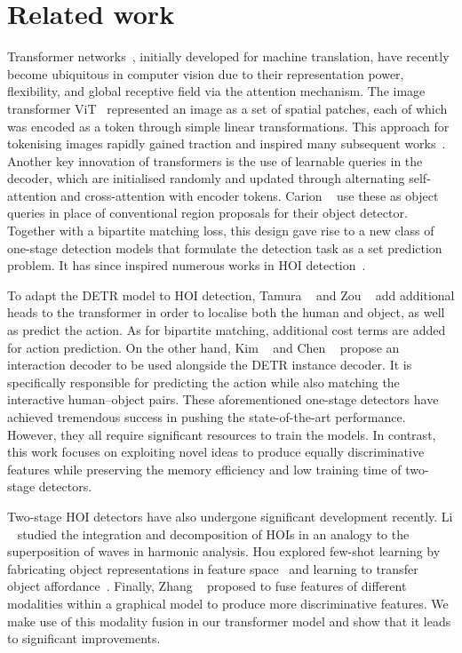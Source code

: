 \documentclass[10pt,twocolumn,letterpaper]{article}
\begin{document}
\section{Related work}

Transformer networks~\cite{xfmer}, initially developed for machine translation, have recently become ubiquitous in computer vision due to their representation power, flexibility, and global receptive field via the attention mechanism. The image transformer ViT~\cite{vit} represented an image as a set of spatial patches, each of which was encoded as a token through simple linear transformations. This approach for tokenising images rapidly gained traction and inspired many subsequent works~\cite{swint}. Another key innovation of transformers is the use of learnable queries in the decoder, which are initialised randomly and updated through alternating self-attention and cross-attention with encoder tokens. Carion \etal~\cite{detr} use these as object queries in place of conventional region proposals for their object detector. Together with a bipartite matching loss, this design gave rise to a new class of one-stage detection models that formulate the detection task as a set prediction problem. It has since inspired numerous works in HOI detection~\cite{qpic, hoitrans, hotr, asnet}.

To adapt the DETR model to HOI detection, Tamura \etal~\cite{qpic} and Zou \etal~\cite{hoitrans} add additional heads to the transformer in order to localise both the human and object, as well as predict the action. As for bipartite matching, additional cost terms are added for action prediction. On the other hand, Kim \etal~\cite{hotr} and Chen \etal~\cite{asnet} propose an interaction decoder to be used alongside the DETR instance decoder. It is specifically responsible for predicting the action while also matching the interactive human--object pairs. These aforementioned one-stage detectors have achieved tremendous success in pushing the state-of-the-art performance. However, they all require significant resources to train the models. In contrast, this work focuses on exploiting novel ideas to produce equally discriminative features while preserving the memory efficiency and low training time of two-stage detectors.

Two-stage HOI detectors have also undergone significant development recently. Li \etal~\cite{idn} studied the integration and decomposition of HOIs in an analogy to the superposition of waves in harmonic analysis. Hou \etal explored few-shot learning by fabricating object representations in feature space~\cite{fcl} and learning to transfer object affordance~\cite{atl}. Finally, Zhang \etal~\cite{scg} proposed to fuse features of different modalities within a graphical model to produce more discriminative features. We make use of this modality fusion in our transformer model and show that it leads to significant improvements.
\end{document}
